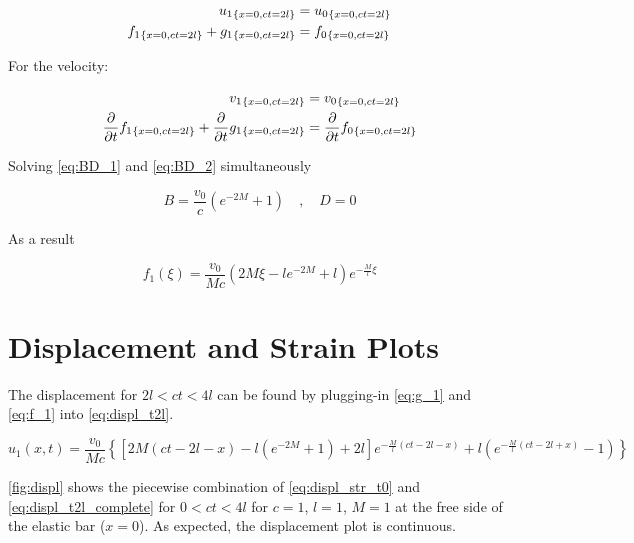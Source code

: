 \documentclass{article}
\begin{document}
\begin{align}
    u_1{_{\{x = 0, ct = 2l\}}} &= u_0{_{\{x = 0, ct = 2l\}}}  \notag \\
    f_1{_{\{x = 0, ct = 2l\}}} + g_1{_{\{x = 0, ct = 2l\}}} &= f_0{_{\{x = 0, ct = 2l\}}}
    \label{eq:BD_1}
\end{align}

For the velocity:

\begin{align}
    v_1{_{\{x = 0, ct = 2l\}}} &= v_0{_{\{x = 0, ct = 2l\}}} \notag \\
    \frac{\partial }{\partial t}f_1{_{\{x = 0, ct = 2l\}}} + \frac{\partial }{\partial t}g_1{_{\{x = 0, ct = 2l\}}} &= \frac{\partial }{\partial t}f_0{_{\{x = 0, ct = 2l\}}}
    \label{eq:BD_2}
\end{align}

Solving \cref{eq:BD_1} and \cref{eq:BD_2} simultaneously 

\begin{equation*}
    B = \frac{v_0}{c}(e^{-2M} + 1) \quad , \quad D = 0
\end{equation*}

As a result 

\begin{equation}
    f_1(\xi) = \frac{v_0}{M c} (2 M \xi - l e^{-2M} + l) e^{-\textstyle\frac{M}{l}\xi}
    \label{eq:f_1}
\end{equation}

\section{Displacement and Strain Plots}
The displacement for $2l<ct<4l$ can be found by plugging-in \cref{eq:g_1} and \cref{eq:f_1} into \cref{eq:displ_t2l}.

\begin{equation}
    u_1(x, t) = \frac{v_0}{M c} \left \{ \left[2 M  \left(c t -2 l -x \right)-l \left({ e}^{-2 M}+1\right)+2 l \right] { e}^{-\textstyle\frac{M}{l}(c t -2 l -x)} + l \left({ e}^{-\textstyle\frac{M}{l}(c t -2 l + x)}-1\right) \right \}
    \label{eq:displ_t2l_complete}
\end{equation}

\cref{fig:displ} shows the piecewise combination of \cref{eq:displ_str_t0} and \cref{eq:displ_t2l_complete} for $0<ct<4l$ for $c = 1$, $ l = 1$,  $M = 1$ at the free side of the elastic bar ($x = 0$). As expected, the displacement plot is continuous. \\
\end{document}

